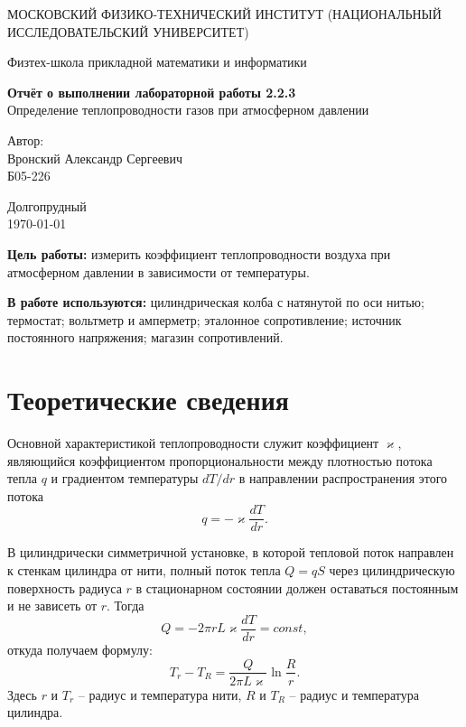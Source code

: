 \documentclass[a4paper,12pt]{article}
\date{\today}
\begin{document}
\begin{titlepage}
	\begin{center}
		{\large МОСКОВСКИЙ ФИЗИКО-ТЕХНИЧЕСКИЙ ИНСТИТУТ (НАЦИОНАЛЬНЫЙ ИССЛЕДОВАТЕЛЬСКИЙ УНИВЕРСИТЕТ)}
	\end{center}
	\begin{center}
		{\large Физтех-школа прикладной математики и информатики}
	\end{center}


	\vspace{4.5cm}
	{\huge
		\begin{center}
			{\bf Отчёт о выполнении лабораторной работы 2.2.3}\\
      Определение теплопроводности газов при атмосферном давлении
		\end{center}
	}
	\vspace{2cm}
	\begin{flushright}
		{\LARGE Автор:\\ Вронский Александр Сергеевич \\
			\vspace{0.2cm}
			Б05-226}
	\end{flushright}
	\vspace{8cm}
	\begin{center}
		Долгопрудный\\
		\today
	\end{center}
\end{titlepage}

\textbf{Цель работы:} измерить коэффициент теплопроводности воздуха при атмосферном давлении в зависимости от температуры.

\textbf{В работе используются:} цилиндрическая колба с натянутой по оси нитью; термостат; вольтметр и амперметр; эталонное сопротивление; источник постоянного напряжения; магазин сопротивлений.

\section{Теоретические сведения}

  Основной характеристикой теплопроводности служит коэффициент $\varkappa$, являющийся коэффициентом пропорциональности между плотностью потока тепла $q$ и градиентом температуры $dT/dr$ в направлении распространения этого потока
  \begin{equation}
    q = -\varkappa \frac{dT}{dr}.
  \end{equation}

  В цилиндрически симметричной установке, в которой тепловой поток направлен к стенкам цилиндра от нити, полный поток тепла $Q = qS$ через цилиндрическую поверхность радиуса $r$ в стационарном состоянии должен оставаться постоянным и не зависеть от $r$. Тогда
  \begin{equation}
    Q = -2\pi rL\varkappa \frac{dT}{dr} = const,
  \end{equation}
  откуда получаем формулу:
  \begin{equation}
    \label{eq:tempdiff}
    T_r - T_R = \frac{Q}{2\pi L\varkappa} \ln \frac{R}{r}.
  \end{equation}
  Здесь $r$ и $T_r$ -- радиус и температура нити, $R$ и $T_R$ -- радиус и температура цилиндра.
\end{document}

